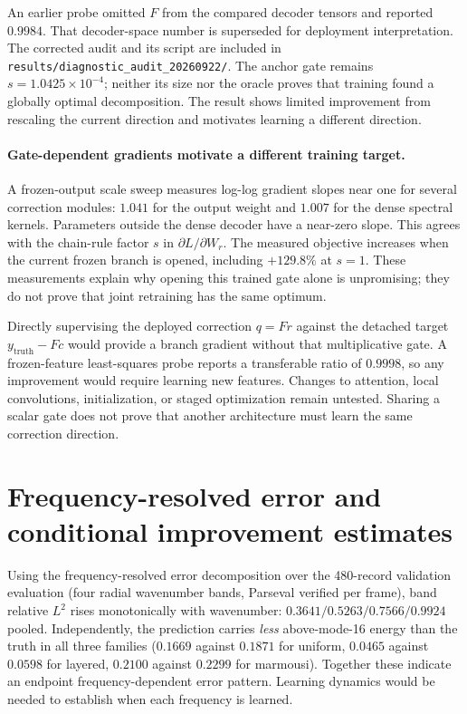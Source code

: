\documentclass[11pt,a4paper]{article}
\begin{document}
An earlier probe omitted $F$ from the compared decoder tensors and reported $0.9984$.
That decoder-space number is superseded for deployment interpretation. The corrected audit
and its script are included in \texttt{results/diagnostic\_audit\_20260922/}.
The anchor gate remains $s=1.0425\times10^{-4}$; neither its size nor the oracle proves that
training found a globally optimal decomposition. The result shows limited improvement from
rescaling the current direction and motivates learning a different direction.

\paragraph{Gate-dependent gradients motivate a different training target.}
A frozen-output scale sweep measures log-log gradient slopes near one for several correction
modules: $1.041$ for the output weight and $1.007$ for the dense spectral kernels. Parameters
outside the dense decoder have a near-zero slope. This agrees with the chain-rule factor
$s$ in $\partial L/\partial W_r$. The measured objective increases when the current frozen
branch is opened, including $+129.8\%$ at $s=1$. These measurements explain why opening this
trained gate alone is unpromising; they do not prove that joint retraining has the same optimum.

Directly supervising the deployed correction $q=Fr$ against the detached target
$y_{\mathrm{truth}}-Fc$ would provide a branch gradient without that multiplicative gate. A frozen-feature least-squares probe
reports a transferable ratio of $0.9998$, so any improvement would require learning new
features. Changes to attention, local convolutions, initialization, or staged optimization
remain untested. Sharing a scalar gate does not prove that another architecture must learn
the same correction direction.

\section{Frequency-resolved error and conditional improvement estimates}

Using the frequency-resolved error decomposition over the 480-record validation evaluation
(four radial wavenumber bands, Parseval verified per frame), band relative $L^2$ rises
monotonically with wavenumber: $0.3641 / 0.5263 / 0.7566 / 0.9924$ pooled. Independently, the
prediction carries \emph{less} above-mode-16 energy than the truth in all three families
($0.1669$ against $0.1871$ for uniform, $0.0465$ against $0.0598$ for layered, $0.2100$
against $0.2299$ for marmousi). Together these indicate an endpoint frequency-dependent error pattern. Learning dynamics
would be needed to establish when each frequency is learned.
\end{document}
